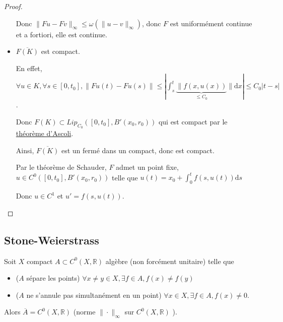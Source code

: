 \begin{proof}
\begin{itemize}
			Donc $\|Fu-Fv\|_{\infty}\le  \omega\left( \|u-v\|_{\infty} \right) $, donc $F$ est uniformément continue et a fortiori, elle est continue.
		\item $\overline{F\left( K \right) }$ est compact.

			En effet, $\forall  u \in K, \forall s \in  [0,t_0], \|Fu\left( t \right) -Fu\left(s \right) \| \le  \left| \int_{s}^{t} \underbrace{\|f\left( x, u\left( x \right)  \right)}_{\le C_0} \| \mathrm{d} x \right| \le C_0 |t-s|$.

			Donc $F \left( K \right) \subset Lip_{C_0}([0,t_0],B'(x_0,r_0))$ qui est compact par le \hyperlink{ascoli}{théorème d'Ascoli}.
   
			Ainsi, $\overline{F\left( K \right) }$ est un fermé dans un compact, donc est compact.

			Par le théorème de Schauder, $F$ admet un point fixe, $ u \in C^0\left( [0,t_0], B'\left( x_0, r_0 \right)  \right) $ telle que $u\left( t \right) = x_0 + \int_{0}^{t} f(s, u\left( t \right) ) \mathrm{d} s $

			Donc $u \in C^1$ et $u' = f\left( s, u\left( t \right)  \right) $.
	\end{itemize}
\end{proof}

\subsection{Stone-Weierstrass}

\begin{theoreme}
	Soit $X$ compact $A \subset C^0\left( X, \mathbb{R} \right) $ algèbre (non forcément unitaire) telle que
	\begin{itemize}
		\item ($A$ sépare les points) $\forall x\neq y \in X, \exists f \in A, f(x) \neq  f(y)$
		\item ($A$ ne s'annule pas simultanément en un point) $\forall x \in X, \exists f \in A, f(x) \neq 0$.
	\end{itemize}

	Alors $\overline{A} = C^0 \left( X,\mathbb{R} \right) $ (norme $\|\cdot \|_{\infty}$ sur $C^0\left(X,\mathbb{R} \right)$ ).
\end{theoreme}

